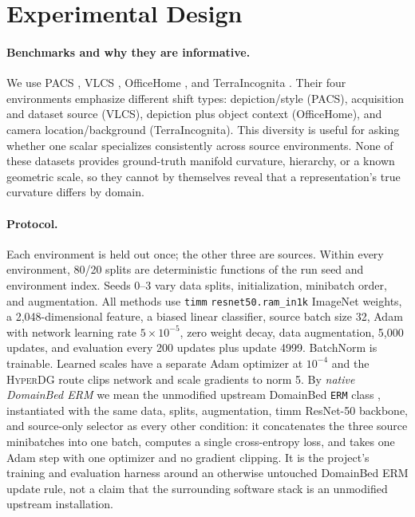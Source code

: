 \documentclass[10pt]{article}
\newcommand{\method}{\textsc{HyperDG}}
\begin{document}
\section{Experimental Design}
\label{sec:experiments}

\paragraph{Benchmarks and why they are informative.}
We use PACS \citep{li2017deeper}, VLCS \citep{fang2013unbiased}, OfficeHome
\citep{venkateswara2017deep}, and TerraIncognita
\citep{beery2018recognition}. Their four environments emphasize different
shift types: depiction/style (PACS), acquisition and dataset source (VLCS),
depiction plus object context (OfficeHome), and camera location/background
(TerraIncognita). This diversity is useful for asking whether one scalar
specializes consistently across source environments. None of these datasets
provides ground-truth manifold curvature, hierarchy, or a known geometric
scale, so they cannot by themselves reveal that a representation's true
curvature differs by domain.

\paragraph{Protocol.}
Each environment is held out once; the other three are sources. Within every
environment, 80/20 splits are deterministic functions of the run seed and
environment index.
Seeds 0--3 vary data splits, initialization, minibatch order, and augmentation.
All methods use \texttt{timm} \texttt{resnet50.ram\_in1k} ImageNet weights, a
2,048-dimensional feature, a biased linear classifier, source batch size 32,
Adam with network learning rate $5\times10^{-5}$, zero weight decay, data
augmentation, 5,000 updates, and evaluation every 200 updates plus update
4999. BatchNorm is trainable. Learned scales have a separate Adam optimizer at
$10^{-4}$ and the \method{} route clips network and scale gradients to norm 5.
By \emph{native DomainBed ERM} we mean the unmodified upstream DomainBed
\texttt{ERM} class \citep{gulrajani2021insearch}, instantiated with the same
data, splits, augmentation, timm ResNet-50 backbone, and source-only selector
as every other condition: it concatenates the three source minibatches into
one batch, computes a single cross-entropy loss, and takes one Adam step with
one optimizer and no gradient clipping. It is the project's training and
evaluation harness around an otherwise untouched DomainBed ERM update rule,
not a claim that the surrounding software stack is an unmodified upstream
installation.
\end{document}
